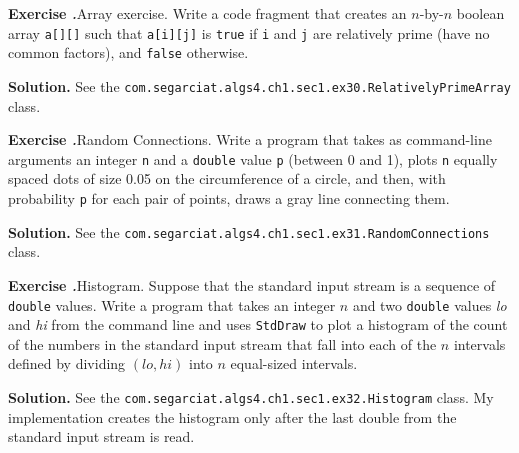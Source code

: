 \documentclass[12pt, a4paper]{article}
\newenvironment{ex}[2][Exercise]
{\par\medskip\noindent \textbf{#1 #2.}}
{\medskip}
\newenvironment{sol}[1][Solution]
{\par\medskip\noindent \textbf{#1.} }
{\medskip}
\begin{document}
	\begin{ex}{30}
		\emph{Array exercise}. Write a code fragment that creates an $n$-by-$n$ boolean
		array \texttt{a[][]} such that \texttt{a[i][j]} is \texttt{true} if \texttt{i}
		and \texttt{j} are relatively prime (have no common factors), and \texttt{false}
		otherwise.
	\end{ex}
	\begin{sol}
		See the \texttt{com.segarciat.algs4.ch1.sec1.ex30.RelativelyPrimeArray} class.
	\end{sol}
	\begin{ex}{31}
		\emph{Random Connections}. Write a program that takes as command-line arguments
		an integer \texttt{n} and a \texttt{double} value \texttt{p} (between 0 and 1),
		plots \texttt{n} equally spaced dots of size 0.05 on the circumference of a circle,
		and then, with probability \texttt{p} for each pair of points, draws a gray line
		connecting them.
	\end{ex}
	\begin{sol}
		See the \texttt{com.segarciat.algs4.ch1.sec1.ex31.RandomConnections} class.
	\end{sol}
	\begin{ex}{32}
		\emph{Histogram}. Suppose that the standard input stream is a sequence of \texttt{double}
		values. Write a program that takes an integer $n$ and two  \texttt{double} values
		\emph{lo} and \emph{hi} from the command line and uses \texttt{StdDraw} to plot a
		histogram of the count of the numbers in the standard input stream that fall into
		each of the $n$ intervals defined by dividing $(lo, hi)$ into $n$ equal-sized intervals.
	\end{ex}
	\begin{sol}
		See the \texttt{com.segarciat.algs4.ch1.sec1.ex32.Histogram} class. My implementation
		creates the histogram only after the last double from the standard input stream is read.
	\end{sol}
	\pagebreak
	\printbibliography
\end{document}

